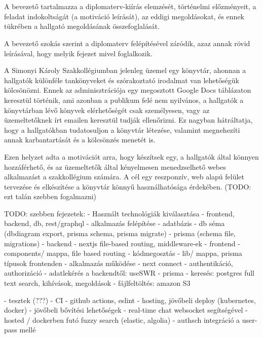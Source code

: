 \chapter{\bevezetes}

A bevezető tartalmazza a diplomaterv-kiírás elemzését, történelmi előzményeit, a feladat indokoltságát (a motiváció leírását), az eddigi megoldásokat, és ennek tükrében a hallgató megoldásának összefoglalását.

A bevezető szokás szerint a diplomaterv felépítésével záródik, azaz annak rövid leírásával, hogy melyik fejezet mivel foglalkozik.

A Simonyi Károly Szakkollégiumban jelenleg üzemel egy könyvtár, ahonnan a hallgatók különféle tankönyveket és szórakoztató irodalmat van lehetőségük kölcsönözni.
Ennek az adminisztrációja egy megosztott Google Docs táblázaton keresztül történik, ami azonban a publikum felé nem nyilvános, a hallgatók a könyvtárban lévő könyvek elérhetőségét csak személyesen,
vagy az üzemeltetőknek írt emailen keresztül tudják ellenőrizni. Ez nagyban hátráltatja, hogy a hallgatókban tudatosuljon a könyvtár létezése, valamint  megnehezíti annak karbantartását és a kölcsönzés menetét is.

Ezen helyzet adta a motivációt arra, hogy készítsek egy, a hallgatók által könnyen hozzáférhető, és az üzemeltetők által kényelmesen menedzselhető webes alkalmazást a szakkollégium számára.
A cél egy reszponzív, web alapú felület tervezése és elkészítése a könyvtár könnyű használhatósága érdekében. (TODO: ezt talán szebben fogalmazni)

TODO: szebben
fejezetek:
- Használt technológiák kiválasztása
  - frontend, backend, db, rest/graphql
- alkalmazás felépítése
  - adatbázis
    - db séma (dbdiagram export, prisma schema, prisma migrate)
    - prisma (schema file, migrations)
  - backend
    - nextjs file-based routing, middleware-ek
  - frontend
    - components/ mappa, file based routing
  - kódmegosztás
    - lib/ mappa, prisma típusok frontenden
- alkalmazás működése
  - next connect
  - authentikáció, authorizáció
  - adatlekérés a backendtől: useSWR
  - prisma
  - keresés: postgres full text search, kihívások, megoldások
  - fájlfeltöltés: amazon S3

- tesztek (???)
- CI
  - github actions, eslint
- hosting, jövőbeli deploy (kubernetes, docker)
- jövőbeli bővítési lehetőségek
  - real-time chat websocket segítségével
  - hosted / dockerben futó fuzzy search (elastic, algolia)
  - authsch integráció a user-pass mellé
